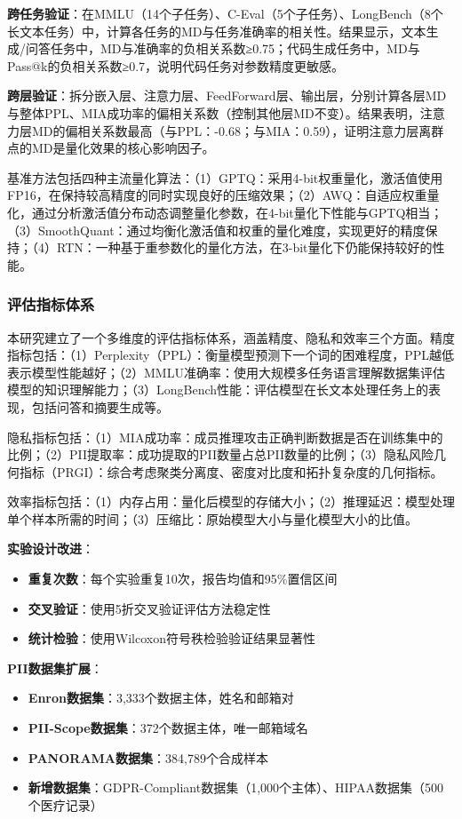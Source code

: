 \textbf{跨任务验证}：在MMLU（14个子任务）、C-Eval（5个子任务）、LongBench（8个长文本任务）中，计算各任务的MD与任务准确率的相关性。结果显示，文本生成/问答任务中，MD与准确率的负相关系数≥0.75；代码生成任务中，MD与Pass@k的负相关系数≥0.7，说明代码任务对参数精度更敏感。

\textbf{跨层验证}：拆分嵌入层、注意力层、FeedForward层、输出层，分别计算各层MD与整体PPL、MIA成功率的偏相关系数（控制其他层MD不变）。结果表明，注意力层MD的偏相关系数最高（与PPL：-0.68；与MIA：0.59），证明注意力层离群点的MD是量化效果的核心影响因子。

基准方法包括四种主流量化算法：（1）GPTQ：采用4-bit权重量化，激活值使用FP16，在保持较高精度的同时实现良好的压缩效果；（2）AWQ：自适应权重量化，通过分析激活值分布动态调整量化参数，在4-bit量化下性能与GPTQ相当；（3）SmoothQuant：通过均衡化激活值和权重的量化难度，实现更好的精度保持；（4）RTN：一种基于重参数化的量化方法，在3-bit量化下仍能保持较好的性能。

\subsubsection{评估指标体系}

本研究建立了一个多维度的评估指标体系，涵盖精度、隐私和效率三个方面。精度指标包括：（1）Perplexity（PPL）：衡量模型预测下一个词的困难程度，PPL越低表示模型性能越好；（2）MMLU准确率：使用大规模多任务语言理解数据集评估模型的知识理解能力；（3）LongBench性能：评估模型在长文本处理任务上的表现，包括问答和摘要生成等。

隐私指标包括：（1）MIA成功率：成员推理攻击正确判断数据是否在训练集中的比例；（2）PII提取率：成功提取的PII数量占总PII数量的比例；（3）隐私风险几何指标（PRGI）：综合考虑聚类分离度、密度对比度和拓扑复杂度的几何指标。

效率指标包括：（1）内存占用：量化后模型的存储大小；（2）推理延迟：模型处理单个样本所需的时间；（3）压缩比：原始模型大小与量化模型大小的比值。

\textbf{实验设计改进}：
\begin{itemize}
\item \textbf{重复次数}：每个实验重复10次，报告均值和95\%置信区间
\item \textbf{交叉验证}：使用5折交叉验证评估方法稳定性
\item \textbf{统计检验}：使用Wilcoxon符号秩检验验证结果显著性
\end{itemize}

\textbf{PII数据集扩展}：
\begin{itemize}
\item \textbf{Enron数据集}：3,333个数据主体，姓名和邮箱对
\item \textbf{PII-Scope数据集}：372个数据主体，唯一邮箱域名
\item \textbf{PANORAMA数据集}：384,789个合成样本
\item \textbf{新增数据集}：GDPR-Compliant数据集（1,000个主体）、HIPAA数据集（500个医疗记录）
\end{itemize}


